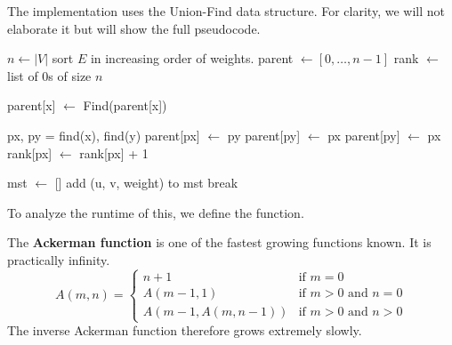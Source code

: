   \begin{algo}
    The implementation uses the Union-Find data structure. For clarity, we will not elaborate it but will show the full pseudocode. 
    \begin{algorithm}[H]
      \label{alg:kruskal}
      \begin{algorithmic}
        \State 
          \State $n \gets |V|$ 
          \State sort $E$ in increasing order of weights. 
          \State parent $\gets [0, \ldots, n-1]$ 
          \State rank $\gets$ list of $0$s of size $n$ 

            \State parent[x] $\gets$ Find(parent[x]) 
            \EndIf
            \State {}
          \EndFunction

            \State px, py = find(x), find(y) 
              \State {}
            \EndIf
              \State parent[px] $\gets$ py
              \State parent[py] $\gets$ px
            \Else{}
              \State parent[py] $\gets$ px 
              \State rank[px] $\gets$ rank[px] + 1
            \EndIf
            \State {}
          \EndFunction

          \State mst $\gets$ [] 
              \State add (u, v, weight) to mst
            \EndIf 
              \State break
            \EndIf 
          \EndFor

          \State {}
        \EndFunction
      \end{algorithmic}
    \end{algorithm}
  \end{algo}
  
  To analyze the runtime of this, we define the function. 

  \begin{definition}
    The \textbf{Ackerman function} is one of the fastest growing functions known. It is practically infinity. 
    \begin{equation}
      A(m,n) = 
      \begin{cases} 
        n+1 & \text{if } m = 0 \\
        A(m-1,1) & \text{if } m > 0 \text{ and } n = 0 \\
        A(m-1,A(m,n-1)) & \text{if } m > 0 \text{ and } n > 0
      \end{cases} 
    \end{equation}
    The inverse Ackerman function therefore grows extremely slowly. 
  \end{definition}

